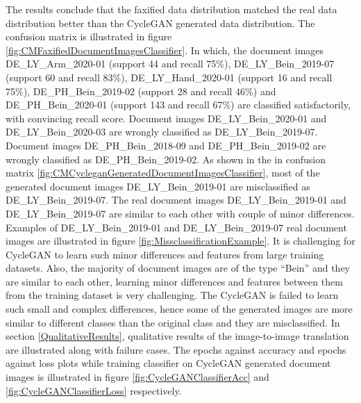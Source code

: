 The results conclude that the faxified data distribution matched the real data distribution better than the \ac{CycleGAN} generated data distribution. The confusion matrix is illustrated in figure \ref{fig:CMFaxifiedDocumentImagesClassifier}. In which, the document images DE\_LY\_Arm\_2020-01 (support 44 and recall 75\%), DE\_LY\_Bein\_2019-07 (support 60 and recall 83\%), DE\_LY\_Hand\_2020-01 (support 16 and recall 75\%), DE\_PH\_Bein\_2019-02 (support 28 and recall 46\%) and DE\_PH\_Bein\_2020-01 (support 143 and recall 67\%) are classified satisfactorily, with convincing recall score. Document images DE\_LY\_Bein\_2020-01 and DE\_LY\_Bein\_2020-03 are wrongly classified as DE\_LY\_Bein\_2019-07. Document images DE\_PH\_Bein\_2018-09 and DE\_PH\_Bein\_2019-02 are wrongly classified as DE\_PH\_Bein\_2019-02. As shown in the in confusion matrix \ref{fig:CMCycleganGeneratedDocumentImagesClassifier}, most of the generated document images DE\_LY\_Bein\_2019-01 are misclassified as DE\_LY\_Bein\_2019-07. The real document images DE\_LY\_Bein\_2019-01 and DE\_LY\_Bein\_2019-07 are similar to each other with couple of minor differences. Examples of DE\_LY\_Bein\_2019-01 and DE\_LY\_Bein\_2019-07 real document images are illustrated in figure \ref{fig:MissclassificationExample}. It is challenging for \ac{CycleGAN} to learn such minor differences and features from large training datasets. Also, the majority of document images are of the type ``Bein'' and they are similar to each other, learning minor differences and features between them from the training dataset is very challenging. The \ac{CycleGAN} is failed to learn such small and complex differences, hence some of the generated images are more similar to different classes than the original class and they are misclassified. In section \ref{QualitativeResults}, qualitative results of the image-to-image translation are illustrated along with failure cases. The epochs against accuracy and epochs against loss plots while training classifier on \ac{CycleGAN} generated document images is illustrated in figure \ref{fig:CycleGANClassifierAcc} and \ref{fig:CycleGANClassifierLoss} respectively.


